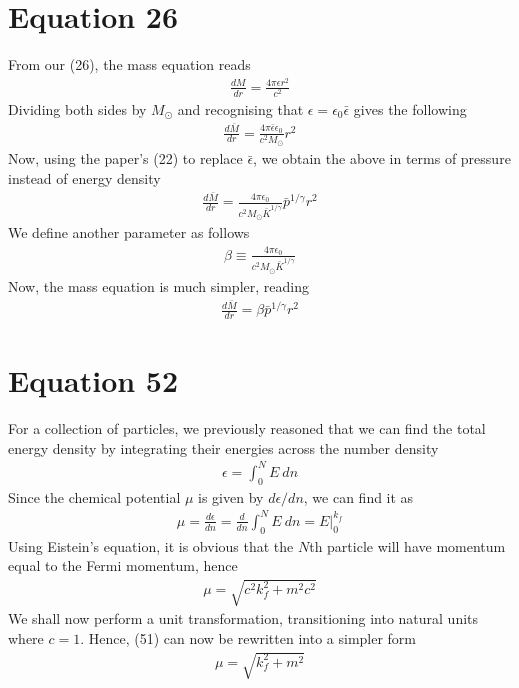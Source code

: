 \documentclass{article}
\begin{document}
\section*{Equation 26}
From our (26), the mass equation reads
\begin{align}
    \frac{dM}{dr}=\frac{4\pi\epsilon r^2}{c^2}
\end{align}
Dividing both sides by $M_{\odot}$ and recognising that $\epsilon=\epsilon_0\bar{\epsilon}$ gives the following 
\begin{align}
    \frac{d\bar{M}}{dr}=\frac{4\pi\bar{\epsilon}\epsilon_0}{c^2M_{\odot}}r^2
\end{align}
Now, using the paper's (22) to replace $\bar{\epsilon}$, we obtain the above in terms of pressure  instead of energy density
\begin{align}
    \frac{d\bar{M}}{dr}=\frac{4\pi\epsilon_0}{c^2M_{\odot}\bar{K}^{1/\gamma}}\bar{p}^{1/\gamma}r^2
\end{align}
We define another parameter as follows 
\begin{align}
    \beta\equiv\frac{4\pi\epsilon_0}{c^2M_{\odot}\bar{K}^{1/\gamma}}
\end{align}
Now, the mass equation is much simpler, reading 
\begin{align}
    \boxed{\frac{d\bar{M}}{dr}=\beta\bar{p}^{1/\gamma}r^2}
\end{align}
\section*{Equation 52}
For a collection of particles, we previously reasoned that we can find the total energy density by 
integrating their energies across the number density 
\begin{align}
    \epsilon=\int_0^N E\ dn
\end{align}
Since the chemical potential $\mu$ is given by $d\epsilon/dn$, we can find it as 
\begin{align}
    \mu=\frac{d\epsilon}{dn}=\frac{d}{dn}\int_0^N E\ dn=E\bigg|_0^{k_f}
\end{align}
Using Eistein's equation, it is obvious that the $N$th particle will have momentum equal to 
the Fermi momentum, hence 
\begin{align}
    \mu=\sqrt{c^2k_f^2+m^2c^2}
\end{align}
We shall now perform a unit transformation, transitioning into natural units where $c=1$. Hence, 
(51) can now be rewritten into a simpler form 
\begin{align}
    \boxed{\mu=\sqrt{k_f^2+m^2}}
\end{align}
\end{document}

